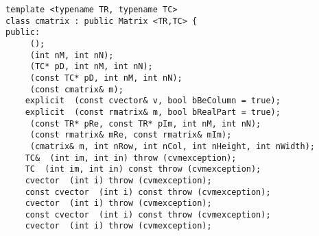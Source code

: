 \bigskip
\noindent
\verb"template <typename TR, typename TC>"\\
\verb"class cmatrix : public Matrix <TR,TC> {"\\
\verb"public:"\\
\verb"    "\verb" ();"\\
\verb"    "\verb" (int nM, int nN);"\\
\verb"    "\verb" (TC* pD, int nM, int nN);"\\
\verb"    "\verb" (const TC* pD, int nM, int nN);"\\
\verb"    "\verb" (const cmatrix& m);"\\
\verb"    explicit "\verb" (const cvector& v, bool bBeColumn = true);"\\
\verb"    explicit "\verb" (const rmatrix& m, bool bRealPart = true);"\\
\verb"    "\verb" (const TR* pRe, const TR* pIm, int nM, int nN);"\\
\verb"    "\verb" (const rmatrix& mRe, const rmatrix& mIm);"\\
\verb"    "\verb" (cmatrix& m, int nRow, int nCol, int nHeight, int nWidth);"\\
\verb"    TC& "\verb" (int im, int in) throw (cvmexception);"\\
\verb"    TC "\verb" (int im, int in) const throw (cvmexception);"\\
\verb"    cvector "\verb" (int i) throw (cvmexception);"\\
\verb"    const cvector "\verb" (int i) const throw (cvmexception);"\\
\verb"    cvector "\verb" (int i) throw (cvmexception);"\\
\verb"    const cvector "\verb" (int i) const throw (cvmexception);"\\
\verb"    cvector "\verb" (int i) throw (cvmexception);"\\
